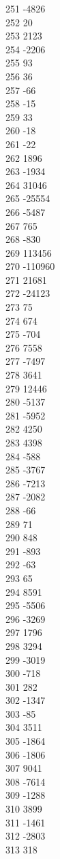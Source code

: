 { 251	-4826 \\
 252	20 \\
 253	2123 \\
 254	-2206 \\
 255	93 \\
 256	36 \\
 257	-66 \\
 258	-15 \\
 259	33 \\
 260	-18 \\
 261	-22 \\
 262	1896 \\
 263	-1934 \\
 264	31046 \\
 265	-25554 \\
 266	-5487 \\
 267	765 \\
 268	-830 \\
 269	113456 \\
 270	-110960 \\
 271	21681 \\
 272	-24123 \\
 273	75 \\
 274	674 \\
 275	-704 \\
 276	7558 \\
 277	-7497 \\
 278	3641 \\
 279	12446 \\
 280	-5137 \\
 281	-5952 \\
 282	4250 \\
 283	4398 \\
 284	-588 \\
 285	-3767 \\
 286	-7213 \\
 287	-2082 \\
 288	-66 \\
 289	71 \\
 290	848 \\
 291	-893 \\
 292	-63 \\
 293	65 \\
 294	8591 \\
 295	-5506 \\
 296	-3269 \\
 297	1796 \\
 298	3294 \\
 299	-3019 \\
 300	-718 \\
 301	282 \\
 302	-1347 \\
 303	-85 \\
 304	3511 \\
 305	-1864 \\
 306	-1806 \\
 307	9041 \\
 308	-7614 \\
 309	-1288 \\
 310	3899 \\
 311	-1461 \\
 312	-2803 \\
 313	318 \\
}
